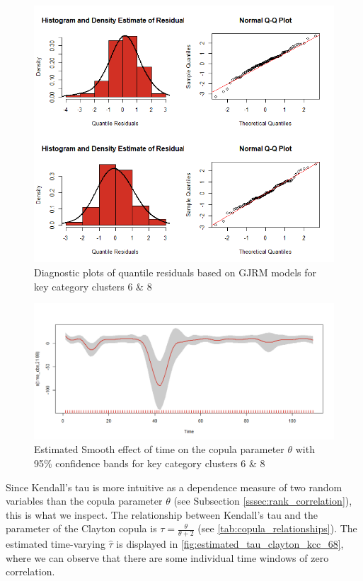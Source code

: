 \begin{figure}[H]
\centering
  \includegraphics[width=0.95\linewidth]{figures/res_hist_qqplot_68.png}
  \caption{Diagnostic plots of quantile residuals based on \ac{GJRM} models for key category clusters 6 \& 8}
  \label{fig:res_hist_qqplot_68}
\end{figure}




\begin{figure}[H]
\centering
  \includegraphics[width=0.95\linewidth]{figures/time_effect_on_theta_68.png}
  \caption{Estimated Smooth effect of time on the copula parameter $\theta$ with 95\% confidence bands for key category clusters 6 \& 8}
  \label{fig:time_effect_on_theta_68}
\end{figure}



Since Kendall's tau is more intuitive as a dependence measure of two random variables than the copula parameter $\theta$ (see Subsection \ref{sssec:rank_correlation}), this is what we inspect. The relationship between Kendall's tau and the parameter of the Clayton copula is $\tau = \frac{\theta}{\theta + 2}$ (see \autoref{tab:copula_relationships}). The estimated time-varying $\hat{\tau}$ is displayed in \autoref{fig:estimated_tau_clayton_kcc_68}, where we can observe that 
there are some individual time windows of zero correlation.\\

